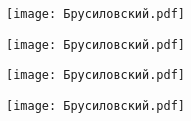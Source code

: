 \documentclass[main.tex]{subfiles}
\begin{document}
\begin{center}
\texttt{[image: Брусиловский.pdf]}
\end{center}

\begin{center}
\texttt{[image: Брусиловский.pdf]}
\end{center}

\begin{center}
\texttt{[image: Брусиловский.pdf]}
\end{center}

\begin{center}
\texttt{[image: Брусиловский.pdf]}
\end{center}
\end{document}
